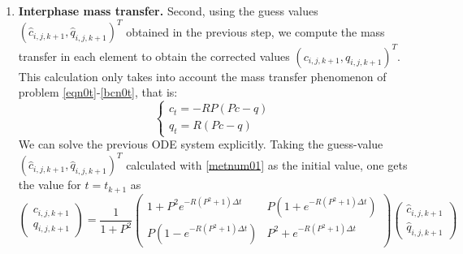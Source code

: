 \documentclass[a4paper]{article}
\numberwithin{equation}{section}
\begin{document}
\begin{enumerate}
\begin{equation*}
\begin{cases}
q_{4,N_x+1,k}:=q_{1,1,k}.
\end{cases}
\end{equation*}
\item \textbf{Interphase mass transfer.} Second, using the guess values $(\hat{c}_{i,j,k+1}, \hat{q}_{i,j,k+1})^T$ obtained in the previous step, we compute the mass transfer in each element to obtain the corrected values $(c_{i,j,k+1}, q_{i,j,k+1})^T$. This calculation only takes into account the mass transfer phenomenon of problem \eqref{eqn0t}-\eqref{bcn0t}, that is:
\begin{equation*}%
\begin{cases}
c_t=-RP(Pc-q)\\
q_t=R(Pc-q)
\end{cases}
\end{equation*}
We can solve the previous ODE system explicitly. Taking the guess-value  $(\hat{c}_{i,j,k+1}, \hat{q}_{i,j,k+1})^T$ calculated with \eqref{metnum01} as the initial value, one gets the value for $t=t_{k+1}$ as
\begin{equation*}%
\begin{pmatrix}
 c_{i,j,k+1} \\ q_{i,j,k+1}\end{pmatrix} =\frac{1}{1+P^2} \begin{pmatrix}1+P^2 e^{-R(P^2+1)\Delta t} &P (1+ e^{-R(P^2+1)\Delta t}) \\
P(1-e^{-R(P^2+1)\Delta t}) & P^2+e^{-R(P^2+1)\Delta t}  \end{pmatrix}
\begin{pmatrix}\hat{c}_{i,j,k+1} \\ \hat{q}_{i,j,k+1} \end{pmatrix}
\end{equation*}
\end{enumerate}
\end{document}
